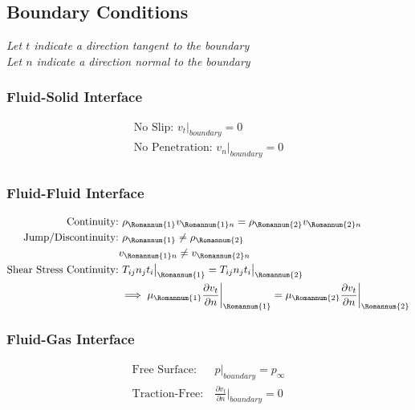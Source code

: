 \documentclass[11pt, letterpaper, notitlepage]{article}
\begin{document}
\subsection{Boundary Conditions} 
\textit{Let $t$ indicate a direction tangent to the boundary} \\
\textit{Let $n$ indicate a direction normal to the boundary}

\subsubsection{Fluid-Solid Interface}
\begin{align*}
\text{No Slip: } v_t\rvert_{boundary} = 0 \\
\text{No Penetration: } v_n\rvert_{boundary} = 0 \\
\end{align*}

\subsubsection{Fluid-Fluid Interface}
\begin{align*}
\text{Continuity:}& \ \rho_\Romannum{1} v_{\Romannum{1} n} = \rho_\Romannum{2} v_{\Romannum{2} n} \\
\text{Jump/Discontinuity:}& \ \rho_\Romannum{1} \neq \rho_\Romannum{2} \\
& v_{\Romannum{1} n} \neq v_{\Romannum{2} n} \\
\text{Shear Stress Continuity:}& \ T_{ij} n_j t_i \bigr\rvert_\Romannum{1} = T_{ij} n_j t_i \bigr\rvert_\Romannum{2} \\
& \implies \mu_\Romannum{1} \frac{\partial v_t}{\partial n} \biggr\rvert_\Romannum{1} = \mu_\Romannum{2} \frac{\partial v_t}{\partial n} \biggr\rvert_\Romannum{2}
\end{align*}

\subsubsection{Fluid-Gas Interface}
\begin{align*}
\text{Free Surface:}& \ p \rvert_{boundary} = p_{\infty} \\
\text{Traction-Free:}& \ \frac{\partial v_t}{\partial n} \biggr\rvert_{boundary} = 0 \\
\end{align*}
\end{document}
